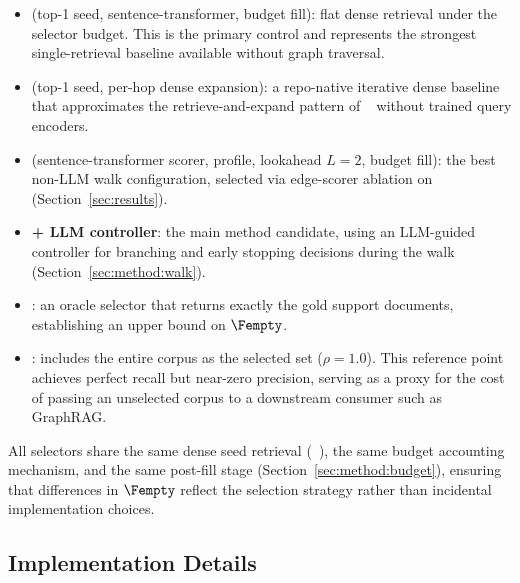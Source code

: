 \begin{itemize}[leftmargin=*,nosep]
\item \textbf{\seldense} (top-1 seed, sentence-transformer, budget
  fill): flat dense retrieval under the selector budget. This is the primary
  control and represents the strongest single-retrieval baseline available
  without graph traversal.

\item \textbf{\selmdrlight} (top-1 seed, per-hop dense expansion):
  a repo-native iterative dense baseline that approximates the
  retrieve-and-expand pattern of \MDR~\cite{xiong2021mdr} without trained
  query encoders.

\item \textbf{\selwalk} (sentence-transformer scorer,
  \stfuture profile, lookahead $L{=}2$, budget fill):
  the best non-LLM walk configuration, selected via edge-scorer ablation on
  \TwoWiki (Section~\ref{sec:results}).

\item \textbf{\selcontroller + LLM controller}: the main
  method candidate, using an LLM-guided controller for branching and early
  stopping decisions during the walk (Section~\ref{sec:method:walk}).

\item \textbf{\seloracle}: an oracle selector that
  returns exactly the gold support documents, establishing an upper bound on
  $\Fempty$.

\item \textbf{\selfullcorpus}: includes the entire
  corpus as the selected set ($\rho = 1.0$). This reference point achieves
  perfect recall but near-zero precision, serving as a proxy for the cost of
  passing an unselected corpus to a downstream consumer such as GraphRAG.
\end{itemize}

All selectors share the same dense seed retrieval
(\stmodel~\cite{reimers2019sentencebert}),
the same budget accounting mechanism, and the same
\budgetfill post-fill stage
(Section~\ref{sec:method:budget}), ensuring that differences in
$\Fempty$ reflect the selection strategy rather than
incidental implementation choices.

\subsection{Implementation Details}
\label{sec:setup:implementation}

